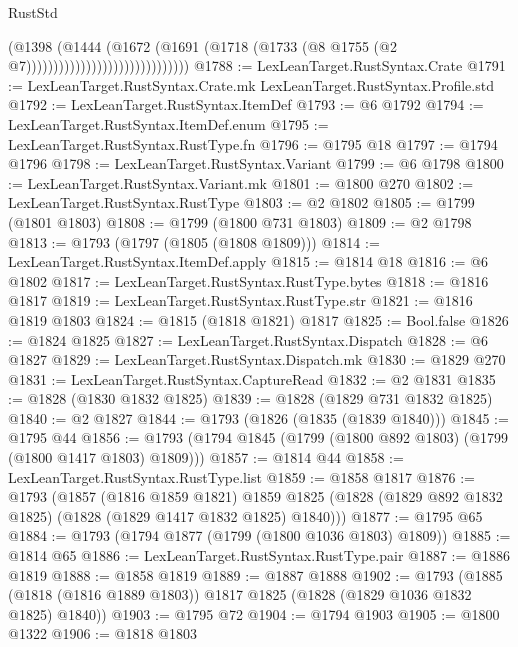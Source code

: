 \begin{lexlean}{RustStd}
\begin{coremodule}
                                                (@1398
                                                  (@1444
                                                    (@1672
                                                      (@1691
                                                        (@1718
                                                          (@1733
                                                            (@8
                                                              @1755
                                                              (@2 @7))))))))))))))))))))))))))))))
@1788 := LexLeanTarget.RustSyntax.Crate
@1791 := LexLeanTarget.RustSyntax.Crate.mk LexLeanTarget.RustSyntax.Profile.std
@1792 := LexLeanTarget.RustSyntax.ItemDef
@1793 := @6 @1792
@1794 := LexLeanTarget.RustSyntax.ItemDef.enum
@1795 := LexLeanTarget.RustSyntax.RustType.fn
@1796 := @1795 @18
@1797 := @1794 @1796
@1798 := LexLeanTarget.RustSyntax.Variant
@1799 := @6 @1798
@1800 := LexLeanTarget.RustSyntax.Variant.mk
@1801 := @1800 @270
@1802 := LexLeanTarget.RustSyntax.RustType
@1803 := @2 @1802
@1805 := @1799 (@1801 @1803)
@1808 := @1799 (@1800 @731 @1803)
@1809 := @2 @1798
@1813 := @1793 (@1797 (@1805 (@1808 @1809)))
@1814 := LexLeanTarget.RustSyntax.ItemDef.apply
@1815 := @1814 @18
@1816 := @6 @1802
@1817 := LexLeanTarget.RustSyntax.RustType.bytes
@1818 := @1816 @1817
@1819 := LexLeanTarget.RustSyntax.RustType.str
@1821 := @1816 @1819 @1803
@1824 := @1815 (@1818 @1821) @1817
@1825 := Bool.false
@1826 := @1824 @1825
@1827 := LexLeanTarget.RustSyntax.Dispatch
@1828 := @6 @1827
@1829 := LexLeanTarget.RustSyntax.Dispatch.mk
@1830 := @1829 @270
@1831 := LexLeanTarget.RustSyntax.CaptureRead
@1832 := @2 @1831
@1835 := @1828 (@1830 @1832 @1825)
@1839 := @1828 (@1829 @731 @1832 @1825)
@1840 := @2 @1827
@1844 := @1793 (@1826 (@1835 (@1839 @1840)))
@1845 := @1795 @44
@1856 := @1793 (@1794 @1845 (@1799 (@1800 @892 @1803) (@1799 (@1800 @1417 @1803) @1809)))
@1857 := @1814 @44
@1858 := LexLeanTarget.RustSyntax.RustType.list
@1859 := @1858 @1817
@1876 := @1793
    (@1857
      (@1816 @1859 @1821)
      @1859
      @1825
      (@1828 (@1829 @892 @1832 @1825) (@1828 (@1829 @1417 @1832 @1825) @1840)))
@1877 := @1795 @65
@1884 := @1793 (@1794 @1877 (@1799 (@1800 @1036 @1803) @1809))
@1885 := @1814 @65
@1886 := LexLeanTarget.RustSyntax.RustType.pair
@1887 := @1886 @1819
@1888 := @1858 @1819
@1889 := @1887 @1888
@1902 := @1793
    (@1885 (@1818 (@1816 @1889 @1803)) @1817 @1825 (@1828 (@1829 @1036 @1832 @1825) @1840))
@1903 := @1795 @72
@1904 := @1794 @1903
@1905 := @1800 @1322
@1906 := @1818 @1803

\end{coremodule}
\end{lexlean}
